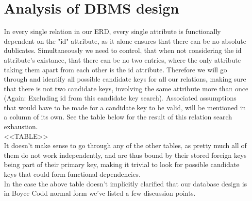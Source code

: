 \section{Analysis of DBMS design}
In every single relation in our ERD, every single attribute is functionally dependent on the "id" attribute, as it alone ensures that there can be no absolute dublicates. Simultaneously we need to control, that when not considering the id attribute's existance, that there can be no two entries, where the only attribute taking them apart from each other is the id attribute.
Therefore we will go through and identify all possible candidate keys for all our relations, making sure that there is not two candidate keys, involving the same attribute more than once (Again: Excluding id from this candidate key search). Associated assumptions that would have to be made for a candidate key to be valid, will be mentioned in a column of its own.
See the table below for the result of this relation search exhaustion.\\

<<TABLE>>\\

It doesn't make sense to go through any of the other tables, as pretty much all of them do not work independently, and are thus bound by their stored foreign keys being part of their primary key, making it trivial to look for possible candidate keys that could form functional dependencies.\\
In the case the above table doesn't implicitly clarified that our database design is in Boyce Codd normal form we've listed a few discussion points.\\ 